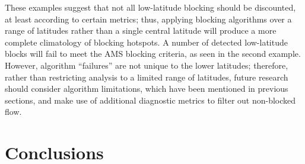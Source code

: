 \documentclass[smallextended]{svjour3}       %
\numberwithin{equation}{section}
\begin{document}
These examples suggest that not all low-latitude blocking should be discounted, at least according to certain metrics; thus, applying blocking algorithms over a range of latitudes rather than a single central latitude will produce a more complete climatology of blocking hotspots. A number of detected low-latitude blocks will fail to meet the AMS blocking criteria, as seen in the second example. However, algorithm ``failures'' are not unique to the lower latitudes; therefore, rather than restricting analysis to a limited range of latitudes, future research should consider algorithm limitations, which have been mentioned in previous sections, and make use of additional diagnostic metrics to filter out non-blocked flow.

\section{Conclusions}\label{concsec}
\end{document}
